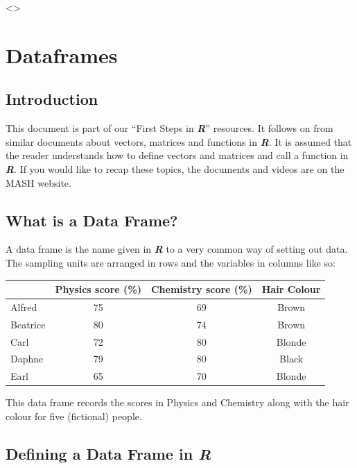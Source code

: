 \documentclass[
]{book}
\begin{document}
\textless{}\details\textgreater{}

\chapter{Dataframes}\label{dataframes}

\section{Introduction}\label{introduction-5}

This document is part of our ``First Steps in \textbf{\emph{R}}'' resources. It follows on from similar documents about vectors, matrices and functions in \textbf{\emph{R}}. It is assumed that the reader understands how to define vectors and matrices and call a function in \textbf{\emph{R}}. If you would like to recap these topics, the documents and videos are on the MASH website.

\section{What is a Data Frame?}\label{what-is-a-data-frame}

A data frame is the name given in \textbf{\emph{R}} to a very common way of setting out data. The sampling units are arranged in rows and the variables in columns like so:

\begin{longtable}[]{@{}lccc@{}}
\toprule\noalign{}
& Physics score (\%) & Chemistry score (\%) & Hair Colour \\
\midrule\noalign{}
\endhead
\bottomrule\noalign{}
\endlastfoot
Alfred & 75 & 69 & Brown \\
Beatrice & 80 & 74 & Brown \\
Carl & 72 & 80 & Blonde \\
Daphne & 79 & 80 & Black \\
Earl & 65 & 70 & Blonde \\
\end{longtable}

This data frame records the scores in Physics and Chemistry along with the hair colour for five (fictional) people.

\section{\texorpdfstring{Defining a Data Frame in \textbf{\emph{R}}}{Defining a Data Frame in R}}\label{defining-a-data-frame-in-r}
\end{document}
